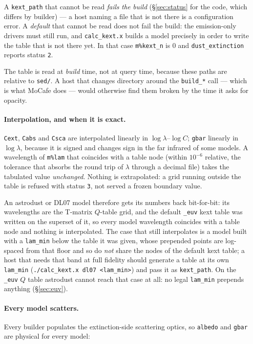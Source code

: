 \documentclass{my_memo}
\newcommand{\code}[1]{\texttt{#1}}
\begin{document}
A \code{kext\_path} that cannot be read \emph{fails the build}
(\S\ref{sec:status} for the code, which differs by builder) --- a host naming a
file that is not there is a configuration error.
A \emph{default} that cannot be read does not fail the build: the
emission-only drivers must still run, and \code{calc\_kext.x} builds a model
precisely in order to write the table that is not there yet. In that case
\code{m\%kext\_n} is $0$ and \code{dust\_extinction} reports status \code{2}.

The table is read at \emph{build} time, not at query time, because these paths
are relative to \code{sed/}. A host that changes directory around the
\code{build\_*} call --- which is what MoCafe does --- would otherwise find them
broken by the time it asks for opacity.

\paragraph{Interpolation, and when it is exact.} \code{Cext}, \code{Cabs} and
\code{Csca} are interpolated linearly in $\log\lambda$--$\log C$;
\code{gbar} linearly in $\log\lambda$, because it is signed and changes sign in
the far infrared of some models. A wavelength of \code{m\%lam} that coincides
with a table node (within $10^{-6}$ relative, the tolerance that absorbs the
round trip of $\lambda$ through a decimal file) takes the tabulated value
\emph{unchanged}. Nothing is extrapolated: a grid running outside the table is
refused with status \code{3}, not served a frozen boundary value.

An astrodust or DL07 model therefore gets its numbers back bit-for-bit: its
wavelengths are the T-matrix $Q$-table grid, and the default \code{\_euv} kext
table was written on the superset of it, so every model wavelength coincides
with a table node and nothing is interpolated. The case that still interpolates
is a model built with a \code{lam\_min} below the table it was given, whose
prepended points are log-spaced from that floor and so do \emph{not} share the
nodes of the default kext table; a host that needs that band at full fidelity
should generate a table at its own \code{lam\_min}
(\code{./calc\_kext.x dl07 <lam\_min>}) and pass it as \code{kext\_path}.
On the \code{\_euv} $Q$ table astrodust cannot reach that case at all: no legal
\code{lam\_min} prepends anything (\S\ref{sec:euv}).

\paragraph{Every model scatters.} Every builder populates the
extinction-side scattering optics, so \code{albedo} and \code{gbar} are physical
for every model:
\end{document}
